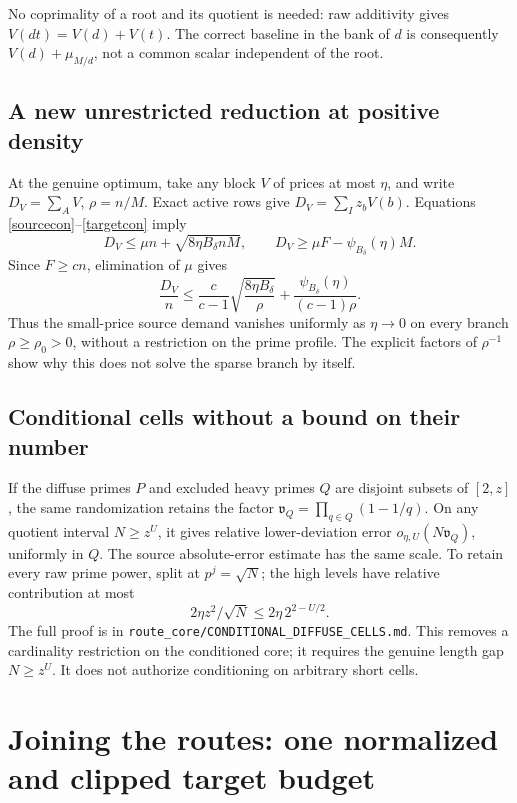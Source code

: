 \documentclass[11pt,a4paper]{article}
\begin{document}
No coprimality of a root and its quotient is needed: raw additivity gives
$V(dt)=V(d)+V(t)$. The correct baseline in the bank of $d$ is consequently
$V(d)+\mu_{M/d}$, not a common scalar independent of the root.

\subsection{A new unrestricted reduction at positive density}

At the genuine optimum, take any block $V$ of prices at most $\eta$, and
write $D_V=\sum_A V$, $\rho=n/M$. Exact active rows give
$D_V=\sum_Iz_bV(b)$. Equations \eqref{sourcecon}--\eqref{targetcon} imply
\[
 D_V\le\mu n+\sqrt{8\eta B_\delta nM},\qquad
 D_V\ge\mu F-\psi_{B_\delta}(\eta)M.
\]
Since $F\ge cn$, elimination of $\mu$ gives
\begin{equation}
 \boxed{\quad
 \frac{D_V}{n}\le
 \frac{c}{c-1}\sqrt{\frac{8\eta B_\delta}{\rho}}
 +\frac{\psi_{B_\delta}(\eta)}{(c-1)\rho}.
 \quad}                                                   \label{dense}
\end{equation}
Thus the small-price source demand vanishes uniformly as $\eta\to0$ on every
branch $\rho\ge\rho_0>0$, without a restriction on the prime profile.
The explicit factors of $\rho^{-1}$ show why this does not solve the sparse
branch by itself.

\subsection{Conditional cells without a bound on their number}

If the diffuse primes $P$ and excluded heavy primes $Q$ are disjoint subsets
of $[2,z]$, the same randomization retains the factor
$\mathfrak v_Q=\prod_{q\in Q}(1-1/q)$. On any quotient interval
$N\ge z^U$, it gives relative lower-deviation error
$o_{\eta,U}(N\mathfrak v_Q)$, uniformly in $Q$. The source absolute-error
estimate has the same scale. To retain every raw prime power, split at
$p^j=\sqrt N$; the high levels have relative contribution at most
\[
 2\eta z^2/\sqrt N\le2\eta\,2^{2-U/2}.
\]
The full proof is in \texttt{route\_core/CONDITIONAL\_DIFFUSE\_CELLS.md}.
This removes a cardinality restriction on the conditioned core; it requires
the genuine length gap $N\ge z^U$. It does not authorize conditioning on
arbitrary short cells.

\section{Joining the routes: one normalized and clipped target budget}
\end{document}
